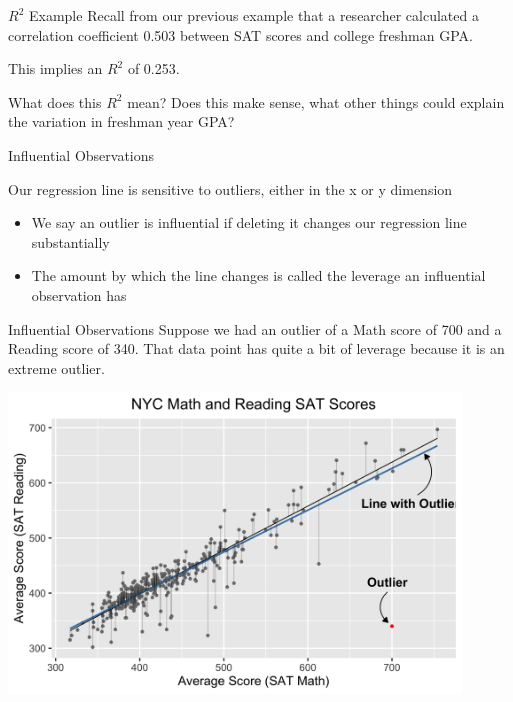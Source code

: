 \documentclass{beamer}
\begin{document}
\begin{frame}{$R^2$ Example}
	Recall from our previous example that a researcher calculated a correlation coefficient 0.503 between SAT scores and college freshman GPA. 
	
	This implies an $R^2$ of 0.253. 
	
	What does this $R^2$ mean? Does this make sense, what other things could explain the variation in freshman year GPA?
\end{frame}


\begin{frame}{Influential Observations}
	
	Our regression line is sensitive to outliers, either in the x or y dimension 
	\begin{itemize} 
		\item We say an outlier is \alert{influential} if deleting it changes our regression line substantially
		\item The amount by which the line changes is called the \alert{leverage} an influential observation has
	\end{itemize}
	
\end{frame}

\begin{frame}{Influential Observations}
	Suppose we had an outlier of a Math score of 700 and a Reading score of 340. That data point has quite a bit of leverage because it is an extreme outlier.
	\begin{center}
		\includegraphics[width=0.9\textwidth]{influentialobs}
	\end{center}
\end{frame}
\end{document}
